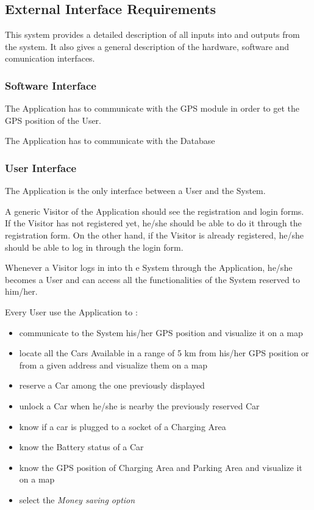 \subsection{External Interface Requirements}
This system provides a detailed description of all inputs into and outputs from the system. It also gives a general description of the hardware, software and comunication interfaces.

\subsubsection{Software Interface}
The Application has to communicate with the GPS module in order to get the GPS position of the User.

The Application has to communicate with the Database 

\subsubsection{User Interface}
The Application is the only interface between a User and the System.

A generic Visitor of the Application should see the registration and login forms. If the Visitor has not registered yet, he/she should be able to do it through the registration form.
On the other hand, if the Visitor is already registered, he/she should be able to log in through the login form.

Whenever a Visitor logs in into th e System through the Application, he/she becomes a User and can access all the functionalities of the System reserved to him/her.

Every User use the Application to :
\begin{itemize}
	\item communicate to the System his/her GPS position and visualize it on a map
	\item locate all the Cars Available in a range of 5 km from his/her GPS position or from a given address and visualize them on a map
	\item reserve a Car among the one previously displayed
	\item unlock a Car when he/she is nearby the previously reserved Car
	\item know if a car is plugged to a socket of a Charging Area
	\item know the Battery status of a Car
	\item know the GPS position of Charging Area and Parking Area and visualize it on a map	
	\item select the \textit{Money saving option}
\end{itemize}

